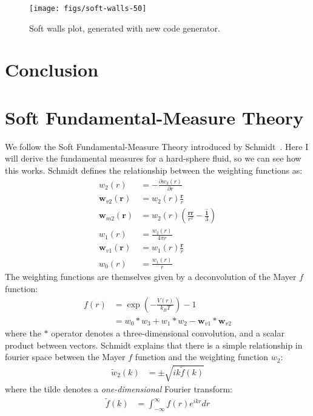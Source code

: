 \documentclass[letterpaper,twocolumn,amsmath,amssymb,prb]{revtex4-1}
\newcommand{\rr}{\textbf{r}}
\begin{document}
\begin{figure}
  \texttt{[image: figs/soft-walls-50]}
  \caption{Soft walls plot, generated with new code generator.}
\end{figure}

\section{Conclusion}

\appendix

\section{Soft Fundamental-Measure Theory}

We follow the Soft Fundamental-Measure Theory introduced by
Schmidt~\cite{schmidt2000fluid}.  Here I will derive the fundamental
measures for a hard-sphere fluid, so we can see how this works.
Schmidt defines the relationship between the weighting functions as:
\begin{align}
  w_2(r) &= -\frac{\partial w_3(r)}{\partial r} \\
  \mathbf{w}_{v2}(\rr) &= w_2(r)\frac{\rr}{r} \\
  \mathbf{w}_{m2}(\rr) &= w_2(r)\left( \frac{\rr \rr}{r^2}
                              - \frac{\mathbf{\hat{1}}}{3} \right) \\
  w_1(r) &= \frac{w_2(r)}{4\pi r} \\
  \mathbf{w}_{v1}(\rr) &= w_1(r) \frac{\rr}{r} \\
  w_0(r) &= \frac{w_1(r)}{r}
\end{align}
The weighting functions are themselves given by a deconvolution of the
Mayer $f$ function:
\begin{align}
  f(r) &= \exp\left(-\frac{V(r)}{k_BT}\right) - 1 \\
  &= w_0 * w_3 + w_1 * w_2 - \mathbf{w}_{v1} * \mathbf{w}_{v2}
\end{align}
where the $*$ operator denotes a three-dimensional convolution, and a
scalar product between vectors.  Schmidt explains that there is a
simple relationship in fourier space between the Mayer $f$ function
and the weighting function $w_2$:
\begin{align}
  \tilde{w}_2(k) &= \pm \sqrt{ik\tilde{f}(k)}
  \label{eq:w2fromf}
\end{align}
where the tilde denotes a \emph{one-dimensional} Fourier transform:
\begin{align}
  \tilde{f}(k) &= \int_{-\infty}^\infty f(r) e^{ikr} dr
\end{align}
\end{document}
